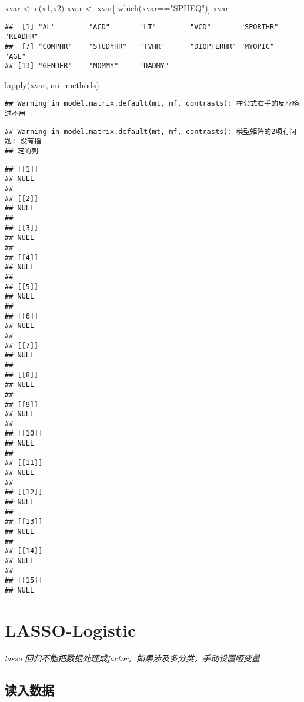 \documentclass[]{ctexbook}
\newenvironment{Shaded}{\begin{snugshade}}{\end{snugshade}}
\newcommand{\FunctionTok}[1]{\textcolor[rgb]{0.00,0.00,0.00}{#1}}
\newcommand{\NormalTok}[1]{#1}
\newcommand{\OtherTok}[1]{\textcolor[rgb]{0.56,0.35,0.01}{#1}}
\newcommand{\SpecialCharTok}[1]{\textcolor[rgb]{0.00,0.00,0.00}{#1}}
\newcommand{\StringTok}[1]{\textcolor[rgb]{0.31,0.60,0.02}{#1}}
\begin{document}
\begin{Shaded}
\begin{Highlighting}[]
\NormalTok{xvar }\OtherTok{\textless{}{-}} \FunctionTok{c}\NormalTok{(x1,x2)}
\NormalTok{xvar }\OtherTok{\textless{}{-}}\NormalTok{ xvar[}\SpecialCharTok{{-}}\FunctionTok{which}\NormalTok{(xvar}\SpecialCharTok{==}\StringTok{"SPHEQ"}\NormalTok{)]}
\NormalTok{xvar}
\end{Highlighting}
\end{Shaded}

\begin{verbatim}
##  [1] "AL"        "ACD"       "LT"        "VCD"       "SPORTHR"   "READHR"   
##  [7] "COMPHR"    "STUDYHR"   "TVHR"      "DIOPTERHR" "MYOPIC"    "AGE"      
## [13] "GENDER"    "MOMMY"     "DADMY"
\end{verbatim}

\begin{Shaded}
\begin{Highlighting}[]
\FunctionTok{lapply}\NormalTok{(xvar,uni\_methods)}
\end{Highlighting}
\end{Shaded}

\begin{verbatim}
## Warning in model.matrix.default(mt, mf, contrasts): 在公式右手的反应略过不用
\end{verbatim}

\begin{verbatim}
## Warning in model.matrix.default(mt, mf, contrasts): 模型矩阵的2项有问题: 没有指
## 定的列
\end{verbatim}

\begin{verbatim}
## [[1]]
## NULL
## 
## [[2]]
## NULL
## 
## [[3]]
## NULL
## 
## [[4]]
## NULL
## 
## [[5]]
## NULL
## 
## [[6]]
## NULL
## 
## [[7]]
## NULL
## 
## [[8]]
## NULL
## 
## [[9]]
## NULL
## 
## [[10]]
## NULL
## 
## [[11]]
## NULL
## 
## [[12]]
## NULL
## 
## [[13]]
## NULL
## 
## [[14]]
## NULL
## 
## [[15]]
## NULL
\end{verbatim}

\hypertarget{lasso-logistic}{%
\chapter{LASSO-Logistic}\label{lasso-logistic}}

\emph{lasso 回归不能把数据处理成factor，如果涉及多分类，手动设置哑变量}

\hypertarget{ux8bfbux5165ux6570ux636e}{%
\section{读入数据}\label{ux8bfbux5165ux6570ux636e}}
\end{document}
